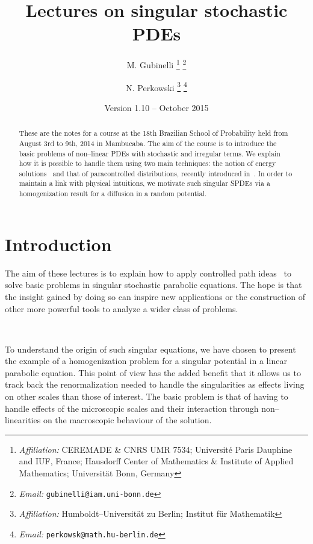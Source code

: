\documentclass[a4paper,11pt]{article}
\newcommand{\tmSep}{; }
\newcommand{\tmaffiliation}[1]{\thanks{\textit{Affiliation:} #1}}
\newcommand{\tmemail}[1]{\thanks{\textit{Email:} \texttt{#1}}}
\begin{document}
\title{\bf{Lectures on singular stochastic PDEs}}

\author{
  M. Gubinelli
  \tmaffiliation{CEREMADE \& CNRS UMR 7534{\tmSep}
  Universit{\'e} Paris Dauphine and IUF, France{\tmSep}
  Hausdorff Center of Mathematics \& Institute of Applied Mathematics{\tmSep}
  Universit\"at Bonn, Germany}
  \tmemail{gubinelli@iam.uni-bonn.de}
  \and
  N. Perkowski
  \tmaffiliation{Humboldt--Universit\"at zu Berlin{\tmSep}
  Institut f\"ur Mathematik}
  \tmemail{perkowsk@math.hu-berlin.de}
}

\date{Version 1.10 -- October 2015}

\maketitle

\begin{abstract}
  These are the notes for a course at the 18th Brazilian School of Probability
  held from August 3rd to 9th, 2014 in Mambucaba. The aim of the course is to
  introduce the basic problems of non--linear PDEs with stochastic and
  irregular terms. We explain how it is possible to handle them using two main
  techniques: the notion of energy
  solutions~{\cite{goncalves_universality_2010,gubinelli_regularization_2013}}
  and that of paracontrolled distributions, recently introduced
  in~{\cite{Gubinelli2012}}. In order to maintain a link with physical
  intuitions, we motivate such singular SPDEs via a homogenization result for
  a diffusion in a random potential. \ 
\end{abstract}

{\tableofcontents}

\section{Introduction}

The aim of these lectures is to explain how to apply controlled path
ideas~{\cite{Gubinelli2004}} to solve basic problems in singular stochastic  parabolic
equations. The hope is that the insight gained by doing so can inspire new applications or
the construction of other more powerful tools to analyze a wider class of
problems.

\

To understand the origin
of such singular equations, we have chosen to present the example of a
homogenization problem for a singular potential in a linear parabolic
equation. This point of view has the added benefit that it allows us to track
back the renormalization needed to handle the singularities as effects living
on other scales than those of interest. The basic problem is that of having to
handle effects of the microscopic scales and their interaction through
non--linearities on the macroscopic behaviour of the solution.
\end{document}
